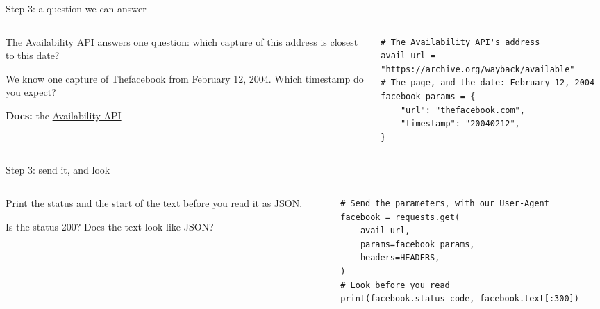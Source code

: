 \documentclass[9pt,aspectratio=169]{beamer}
\begin{document}
\begin{frame}[fragile]{Step 3: a question we can answer}
    \begin{columns}[T]
        \begin{column}{0.37\textwidth}
            The Availability API answers one question: which capture of this address is closest to this date?

            \medskip
            We know one capture of Thefacebook from February 12, 2004. Which timestamp do you expect?

            \medskip
            {\scriptsize\textbf{Docs:} the \href{https://archive.org/help/wayback_api.php}{Availability API}\par}
        \end{column}
        \begin{column}{0.6\textwidth}
\begin{lstlisting}
# The Availability API's address
avail_url = "https://archive.org/wayback/available"
# The page, and the date: February 12, 2004
facebook_params = {
    "url": "thefacebook.com",
    "timestamp": "20040212",
}
\end{lstlisting}
        \end{column}
    \end{columns}
\end{frame}

\begin{frame}[fragile]{Step 3: send it, and look}
    \begin{columns}[T]
        \begin{column}{0.37\textwidth}
            Print the status and the start of the text before you read it as JSON.

            \medskip
            Is the status 200? Does the text look like JSON?
        \end{column}
        \begin{column}{0.6\textwidth}
\begin{lstlisting}
# Send the parameters, with our User-Agent
facebook = requests.get(
    avail_url,
    params=facebook_params,
    headers=HEADERS,
)
# Look before you read
print(facebook.status_code, facebook.text[:300])
\end{lstlisting}
        \end{column}
    \end{columns}
\end{frame}
\end{document}
